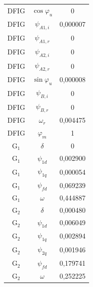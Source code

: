 \begin{longtable}{c c c}
	DFIG & $\cos\varphi_u$ & 0         \\
	DFIG & $\psi_{A1,i}$ & 0,000007  \\
	DFIG & $\psi_{A1,r}$ & 0         \\
	DFIG & $\psi_{A2,i}$ & 0         \\
	DFIG & $\psi_{A2,r}$ & 0         \\
	DFIG & $\sin\varphi_u$ & 0,000008  \\
	DFIG & $\psi_{B,i}$ & 0         \\
	DFIG & $\psi_{B,r}$ & 0         \\
	DFIG & $\omega_r$ & 0,004475  \\
	DFIG & $\varphi_m$ & 1         \\
	G$_1$ & $\delta$ & 0         \\
	G$_1$ & $\psi_{1d}$ & 0,002900  \\
	G$_1$ & $\psi_{1q}$ & 0,000054  \\
	G$_1$ & $\psi_{fd}$ & 0,069239  \\
	G$_1$ & $\omega$ & 0,444887  \\
	G$_2$ & $\delta$ & 0,000480  \\
	G$_2$ & $\psi_{1d}$ & 0,006049  \\
	G$_2$ & $\psi_{1q}$ & 0,002894  \\
	G$_2$ & $\psi_{2q}$ & 0,001946  \\
	G$_2$ & $\psi_{fd}$ & 0,179741  \\
	G$_2$ & $\omega$ & 0,252225  \\
\end{longtable}
\par
\endgroup


